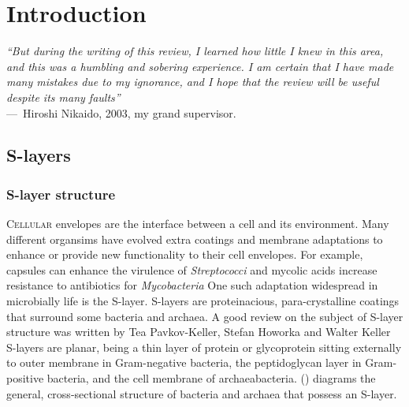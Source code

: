 
\acresetall{}

\chapter{Introduction}
\label{ch:Introduction}

\begin{epigraph} \emph{``But during the writing of this review, I learned how little I knew in this
    area, and this was a humbling and sobering experience. I am certain that I have made many
    mistakes due to my ignorance, and I hope that the review will be useful despite its many faults''}\\
  ---~Hiroshi Nikaido, 2003, my grand supervisor.
\end{epigraph}
\section{S-layers} \label{sec:intro-slayers}
\subsection{S-layer structure} %
\label{sub:s_layer_structure} \lettrine[lines=2]{C}{ellular} envelopes are the interface between a
cell and its environment. Many different organsims have evolved extra coatings and membrane
adaptations to enhance or provide new functionality to their cell envelopes. For example, capsules
can enhance the virulence of \textit{Streptococci} and mycolic
acids increase resistance to antibiotics for \textit{Mycobacteria}
One such adaptation widespread in microbially life is the \ac{S-layer}. \Acp{S-layer} are
proteinacious, para-crystalline coatings that surround some bacteria and
archaea. A good review on the subject of \ac{S-layer} structure was written by Tea Pavkov-Keller, Stefan Howorka and Walter Keller \Acp{S-layer} are planar, being a thin layer of protein or glycoprotein sitting externally to outer membrane in Gram-negative bacteria, the
peptidoglycan layer in Gram-positive bacteria, and the cell membrane of
archaeabacteria.  () diagrams the general,
cross-sectional structure of bacteria and archaea that possess an S-layer.

